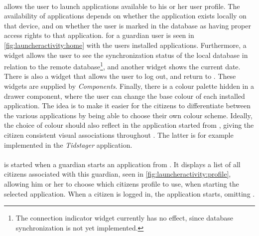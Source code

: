 \paragraph{\homeactivity} allows the user to launch \giraf applications available to his or her user profile. 
The availability of applications depends on whether the application exists locally on that device, and on whether the user is marked in the database as having proper access rights to that application.
\homeactivity for a guardian user is seen in \cref{fig:launcheractivity:home} with the users installed \giraf applications.
Furthermore, a widget allows the user to see the synchronization status of the local database in relation to the remote database\footnote{The connection indicator widget currently has no effect, since database synchronization is not yet implemented.}, and another widget shows the current date.
There is also a widget that allows the user to log out, and return to \authenticationactivity.
These widgets are supplied by \textit{\giraf Components}.
Finally, there is a colour palette hidden in a drawer component, where the user can change the base colour of each installed application.
The idea is to make it easier for the citizens to differentiate between the various applications by being able to choose their own colour scheme. 
Ideally, the choice of colour should also reflect in the application started from \launcher, giving the citizen consistent visual associations throughout \giraf.
The latter is for example implemented in the \textit{Tidstager} application.

\paragraph{\profileselectionactivity} is started when a guardian starts an application from \launcher. 
It displays a list of all citizens associated with this guardian, seen in \cref{fig:launcheractivity:profile}, allowing him or her to choose which citizens profile to use, when starting the selected application. 
When a citizen is logged in, the application starts, omitting \profileselectionactivity.